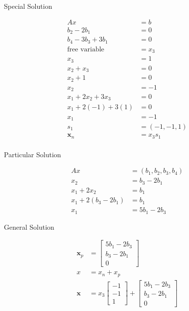 \documentclass[main.tex]{subfiles}
\begin{document}
\begin{enumerate}
    Special Solution
    
    $$
    \begin{aligned}
    A x &= b\\
    b_{2}-2 b_{1} &= 0 \\
    b_{4}-3 b_{3}+3 b_{1} &= 0 \\
    \text{free variable } & = x_3 \\
    x_3 &= 1\\
    x_2+x_{3} &= 0 \\
    x_2+1 &= 0 \\
    x_2 &= -1 \\
    x_{1}+2 x_{2}+3 x_{3} &=0 \\
    x_{1}+2(-1)+3(1) &=0 \\
    x_{1} &=-1\\
    s_{1}&=(-1,-1,1)\\
    \bm{x}_{n} &= x_{3} s_{1}\\
    \end{aligned}
    $$
    
    Particular Solution
    
    $$
    \begin{aligned}
    A x &= \left(b_{1}, b_{2}, b_{3}, b_{4}\right)\\
    x_{2} &= b_{3}-2 b_{1}\\
    x_{1}+2 x_{2} &= b_{1} \\
    x_{1}+2\left(b_{3}-2 b_{1}\right) &= b_{1} \\
    x_{1} &= 5 b_{1}-2 b_{3}
    \end{aligned}
    $$
    
    General Solution
    
    $$
    \begin{aligned}
    \bm{x}_{p} &= \left[\begin{array}{c}
    5b_1-2b_3 \\
    b_3-2b_1 \\
    0
    \end{array}\right]\\
    x &= x_{n}+x_{p} \\
    \bm{x} &= x_{3}\left[\begin{array}{c}
    -1 \\
    -1 \\
    1
    \end{array}\right]+\left[\begin{array}{c}
    5b_1-2b_3 \\
    b_3-2b_1 \\
    0
    \end{array}\right]
    \end{aligned}
    $$
    

\end{enumerate}
\end{document}
